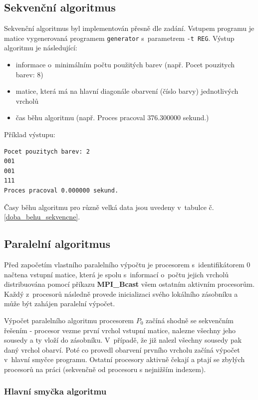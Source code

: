 \documentclass[12pt]{article}
\begin{document}
\subsection{Sekvenční algoritmus}
Sekvenční algoritmus byl implementován přesně dle zadání. Vstupem programu je matice vygenerovaná programem \texttt{generator} s~parametrem \texttt{-t REG}. Výstup algoritmu je následující:
\begin{itemize}
\item informace o~minimálním počtu použitých barev (např. Pocet pouzitych barev: 8)
\item matice, která má na hlavní diagonále obarvení (číslo barvy) jednotlivých vrcholů
\item čas běhu algoritmu (např. Proces pracoval 376.300000 sekund.)
\end{itemize}

Příklad výstupu:
\begin{verbatim}
Pocet pouzitych barev: 2
001
001
111
Proces pracoval 0.000000 sekund.
\end{verbatim}

Časy běhu algoritmu pro různě velká data jsou uvedeny v~tabulce č. \ref{doba_behu_sekvencne}.

\subsection{Paralelní algoritmus}

Před započetím vlastního paralelního výpočtu je procesorem s~identifikátorem 0 načtena vstupní matice, která je spolu s~informací o~počtu jejich vrcholů distribuována pomocí příkazu \textbf{MPI\_Bcast} všem ostatním aktivním procesorům. Každý z~procesorů následně provede inicializaci svého lokálního zásobníku a může být zahájen paralelní výpočet.

Výpočet paralelního algoritmu procesorem $P_0$ začíná shodně se sekvenčním řešením - procesor vezme první vrchol vstupní matice, nalezne všechny jeho sousedy a ty vloží do zásobníku. V~případě, že již nalezl všechny sousedy pak daný vrchol obarví. Poté co provedl obarvení prvního vrcholu začíná výpočet v~hlavní smyčce programu. Ostatní procesory aktivně čekají a ptají se zbylých procesorů na práci (sekvenčně od procesoru s nejnižším indexem).

\subsubsection{Hlavní smyčka algoritmu}
\end{document}
